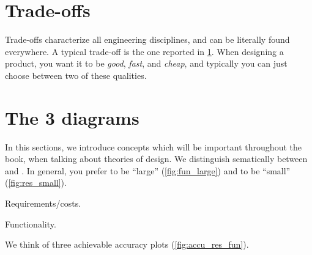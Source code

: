 \section{Trade-offs}

Trade-offs characterize all engineering disciplines, and can be literally found everywhere. A typical trade-off is the one reported in \cref{fig:fast_good_cheap}. When designing a product, you want it to be \emph{good}, \emph{fast}, and \emph{cheap}, and typically you can just choose between two of these qualities.

\begin{figure}[h!]
  \begin{center}
  \end{center}
  \caption{}
  \label{fig:fast_good_cheap}
\end{figure}


\section{The 3 diagrams}

\devel{} %

In this sections, we introduce concepts which will be important throughout the book, when talking about theories of design.
We distinguish sematically between  and .
In general, you prefer  to be ``large'' (\cref{fig:fun_large}) and  to be ``small'' (\cref{fig:res_small}).

\begin{marginfigure}
  \begin{center}
\end{center}
   \caption{Requirements/costs. \label{fig:res_small}}

\end{marginfigure}

\begin{marginfigure}
  \begin{center}
  \end{center}
  \caption{Functionality. \label{fig:fun_large}}
\end{marginfigure}

We think of three achievable accuracy plots (\cref{fig:accu_res_fun}).

